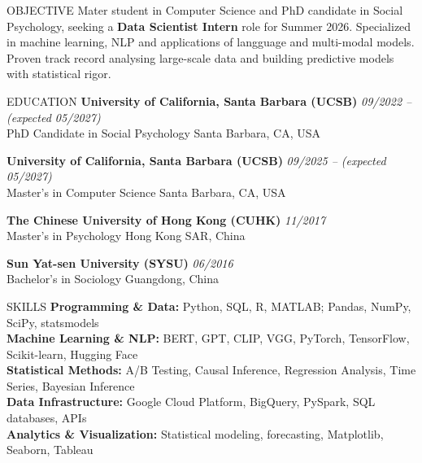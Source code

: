 \documentclass{resume} %
\begin{document}
\begin{rSection}{OBJECTIVE}
Mater student in Computer Science and PhD candidate in Social Psychology, seeking a \textbf{Data Scientist Intern} role for Summer 2026. 
Specialized in machine learning, NLP and applications of langguage and multi-modal models. 
Proven track record analysing large-scale data and building predictive models with statistical rigor.
\end{rSection}

\begin{rSection}{EDUCATION}
{\bf University of California, Santa Barbara (UCSB)} \hfill {\em 09/2022 -- (expected 05/2027)} \\
PhD Candidate in Social Psychology \hfill Santa Barbara, CA, USA 

{\bf University of California, Santa Barbara (UCSB)} \hfill {\em 09/2025 -- (expected 05/2027)} \\
Master's in Computer Science \hfill Santa Barbara, CA, USA 

{\bf The Chinese University of Hong Kong (CUHK)} \hfill {\em 11/2017} \\
Master's in Psychology \hfill Hong Kong SAR, China

{\bf Sun Yat-sen University (SYSU)} \hfill {\em 06/2016} \\
Bachelor's in Sociology \hfill Guangdong, China
\end{rSection}

\begin{rSection}{SKILLS}
\textbf{Programming \& Data:} Python, SQL, R, MATLAB; Pandas, NumPy, SciPy, statsmodels \\
\textbf{Machine Learning \& NLP:} BERT, GPT, CLIP, VGG, PyTorch, TensorFlow, Scikit-learn, Hugging Face \\
\textbf{Statistical Methods:} A/B Testing, Causal Inference, Regression Analysis, Time Series, Bayesian Inference \\
\textbf{Data Infrastructure:} Google Cloud Platform, BigQuery, PySpark, SQL databases, APIs \\
\textbf{Analytics \& Visualization:} Statistical modeling, forecasting, Matplotlib, Seaborn, Tableau

\end{rSection}
\end{document}
